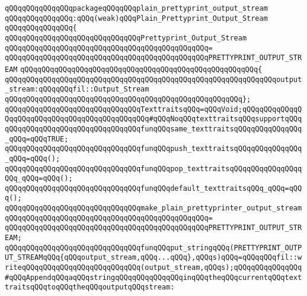 \verb|qQQqqQQqqQQqqQQqpackageqQQqqQQqplain_prettyprint_output_stream|\newline
\verb|qQQqqQQqqQQqqQQq:qQQq(weak)qQQqPlain_Prettyprint_Output_Stream|\newline
\verb|qQQqqQQqqQQqqQQq{|\newline
\verb|qQQqqQQqqQQqqQQqqQQqqQQqqQQqqQQqPrettyprint_Output_Stream|\newline
\verb|qQQqqQQqqQQqqQQqqQQqqQQqqQQqqQQqqQQqqQQqqQQqqQQq=|\newline
\verb|qQQqqQQqqQQqqQQqqQQqqQQqqQQqqQQqqQQqqQQqqQQqqQQqPRETTYPRINT_OUTPUT_STREAM|\newline
\verb|qQQqqQQqqQQqqQQqqQQqqQQqqQQqqQQqqQQqqQQqqQQqqQQqqQQqqQQq{|\newline
\verb|qQQqqQQqqQQqqQQqqQQqqQQqqQQqqQQqqQQqqQQqqQQqqQQqqQQqqQQqqQQqqQQqoutput_stream:qQQqqQQqfil::Output_Stream|\newline
\verb|qQQqqQQqqQQqqQQqqQQqqQQqqQQqqQQqqQQqqQQqqQQqqQQqqQQqqQQq};|\newline
\newline
\verb|qQQqqQQqqQQqqQQqqQQqqQQqqQQqqQQqTexttraitsqQQq=qQQqVoid;qQQqqQQqqQQqqQQqqQQqqQQqqQQqqQQqqQQqqQQqqQQqqQQq#qQQqNoqQQqtexttraitsqQQqsupportqQQq|\newline
\newline
\verb|qQQqqQQqqQQqqQQqqQQqqQQqqQQqqQQqfunqQQqsame_texttraitsqQQqqQQqqQQqqQQq_qQQq=qQQqTRUE;|\newline
\verb|qQQqqQQqqQQqqQQqqQQqqQQqqQQqqQQqfunqQQqpush_texttraitsqQQqqQQqqQQqqQQq_qQQq=qQQq();|\newline
\verb|qQQqqQQqqQQqqQQqqQQqqQQqqQQqqQQqfunqQQqpop_texttraitsqQQqqQQqqQQqqQQqqQQq_qQQq=qQQq();|\newline
\verb|qQQqqQQqqQQqqQQqqQQqqQQqqQQqqQQqfunqQQqdefault_texttraitsqQQq_qQQq=qQQq();|\newline
\newline
\verb|qQQqqQQqqQQqqQQqqQQqqQQqqQQqqQQqmake_plain_prettyprinter_output_stream|\newline
\verb|qQQqqQQqqQQqqQQqqQQqqQQqqQQqqQQqqQQqqQQqqQQqqQQq=|\newline
\verb|qQQqqQQqqQQqqQQqqQQqqQQqqQQqqQQqqQQqqQQqqQQqqQQqPRETTYPRINT_OUTPUT_STREAM;|\newline
\newline
\verb|qQQqqQQqqQQqqQQqqQQqqQQqqQQqqQQqfunqQQqput_stringqQQq(PRETTYPRINT_OUTPUT_STREAMqQQq{qQQqoutput_stream,qQQq...qQQq},qQQqs)qQQq=qQQqqQQqfil::writeqQQqqQQqqQQqqQQqqQQqqQQqqQQq(output_stream,qQQqs);qQQqqQQqqQQqqQQq#qQQqAppendqQQqaqQQqstringqQQqqQQqqQQqqQQqinqQQqtheqQQqcurrentqQQqtexttraitsqQQqtoqQQqtheqQQqoutputqQQqstream:|\newline
